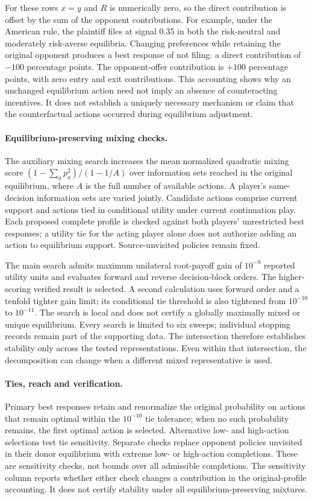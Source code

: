 For these rows $x=y$ and $R$ is numerically zero, so the direct contribution is
offset by the sum of the opponent contributions. For example, under the
American rule, the plaintiff files at signal 0.35 in both the risk-neutral and
moderately risk-averse equilibria. Changing preferences while retaining the
original opponent produces a best response of not filing: a direct contribution
of $-100$ percentage points. The opponent-offer contribution is $+100$
percentage points, with zero entry and exit contributions. This accounting
shows why an unchanged equilibrium action need not imply an absence of
counteracting incentives. It does not establish a uniquely necessary mechanism
or claim that the counterfactual actions occurred during equilibrium adjustment.

\paragraph{Equilibrium-preserving mixing checks.}
The auxiliary mixing search increases the mean normalized quadratic mixing
score $(1-\sum_a p_a^2)/(1-1/A)$ over information sets reached in the original
equilibrium, where $A$ is the full number of available actions. A player's
same-decision information sets are varied jointly. Candidate actions comprise
current support and actions tied in conditional utility under current
continuation play. Each proposed complete profile is checked against both
players' unrestricted best responses; a utility tie for the acting player alone
does not authorize adding an action to equilibrium support. Source-unvisited
policies remain fixed.

The main search admits maximum unilateral root-payoff gain of $10^{-9}$ reported
utility units and evaluates forward and reverse decision-block orders. The
higher-scoring verified result is selected. A second calculation uses forward
order and a tenfold tighter gain limit; its conditional tie threshold is also
tightened from $10^{-10}$ to $10^{-11}$. The search is local and does not certify
a globally maximally mixed or unique equilibrium. Every search is limited to
six sweeps; individual stopping records remain part of the supporting data.
The intersection therefore establishes stability only across the tested
representations. Even within that intersection, the decomposition can change
when a different mixed representative is used.

\paragraph{Ties, reach and verification.}
Primary best responses retain and renormalize the original probability on
actions that remain optimal within the $10^{-10}$ tie tolerance; when no such
probability remains, the first optimal action is selected. Alternative low- and
high-action selections test tie sensitivity. Separate checks replace opponent
policies unvisited in their donor equilibrium with extreme low- or high-action
completions. These are sensitivity checks, not bounds over all admissible
completions. The sensitivity column reports whether either check changes a
contribution in the original-profile accounting. It does not certify stability
under all equilibrium-preserving mixtures.

